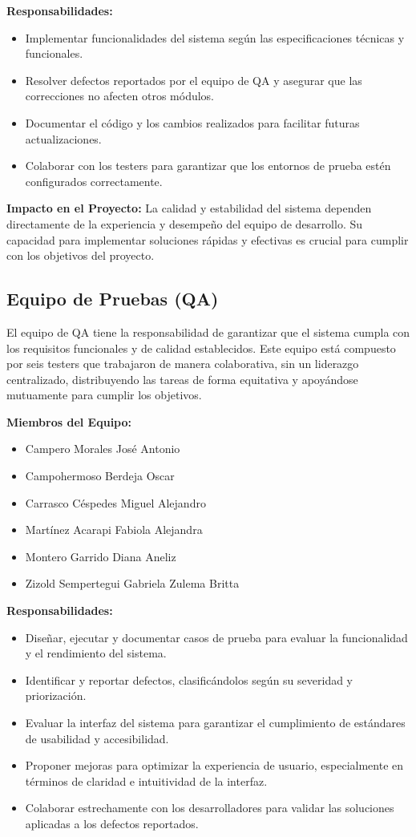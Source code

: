 \documentclass[stu, 12pt, letterpaper, donotrepeattitle, floatsintext, natbib]{apa7}
\begin{document}
    \textbf{Responsabilidades:}
    \begin{itemize}
        \item Implementar funcionalidades del sistema según las especificaciones técnicas y funcionales.
        \item Resolver defectos reportados por el equipo de QA y asegurar que las correcciones no afecten otros módulos.
        \item Documentar el código y los cambios realizados para facilitar futuras actualizaciones.
        \item Colaborar con los testers para garantizar que los entornos de prueba estén configurados correctamente.
    \end{itemize}

    \textbf{Impacto en el Proyecto:}  
    La calidad y estabilidad del sistema dependen directamente de la experiencia y desempeño del equipo de desarrollo. Su capacidad para implementar soluciones rápidas y efectivas es crucial para cumplir con los objetivos del proyecto.


\subsection{Equipo de Pruebas (QA)} 
El equipo de QA tiene la responsabilidad de garantizar que el sistema cumpla con los requisitos funcionales y de calidad establecidos. Este equipo está compuesto por seis testers que trabajaron de manera colaborativa, sin un liderazgo centralizado, distribuyendo las tareas de forma equitativa y apoyándose mutuamente para cumplir los objetivos.

\textbf{Miembros del Equipo:}
\begin{itemize}
    \item Campero Morales José Antonio
    \item Campohermoso Berdeja Oscar
    \item Carrasco Céspedes Miguel Alejandro
    \item Martínez Acarapi Fabiola Alejandra
    \item Montero Garrido Diana Aneliz
    \item Zizold Sempertegui Gabriela Zulema Britta
\end{itemize}

\textbf{Responsabilidades:}
\begin{itemize}
    \item Diseñar, ejecutar y documentar casos de prueba para evaluar la funcionalidad y el rendimiento del sistema.
    \item Identificar y reportar defectos, clasificándolos según su severidad y priorización.
    \item Evaluar la interfaz del sistema para garantizar el cumplimiento de estándares de usabilidad y accesibilidad.
    \item Proponer mejoras para optimizar la experiencia de usuario, especialmente en términos de claridad e intuitividad de la interfaz.
    \item Colaborar estrechamente con los desarrolladores para validar las soluciones aplicadas a los defectos reportados.
\end{itemize}
\end{document}

